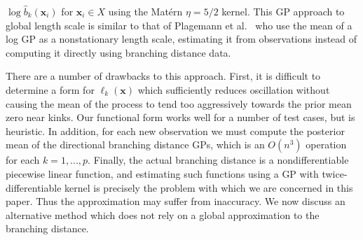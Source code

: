\documentclass{article}
\renewcommand{\vec}[1]{\mathbf{#1}}
\numberwithin{equation}{section}
\begin{document}
$\log \hat{b}_k(\vec{x}_i)$ for $\vec{x}_i \in X$ using the Mat\'ern $\eta = 5/2$ kernel. This GP approach to global length scale is similar to that of Plagemann et al.~\cite{plagemann2008nonstationary} who use the mean of a log GP as a nonstationary length scale, estimating it from observations instead of computing it directly using branching distance data.

There are a number of drawbacks to this approach. First, it is difficult to determine a form for $\ell_k(\vec{x})$ which sufficiently reduces oscillation without causing the mean of the process to tend too aggressively towards the prior mean zero near kinks. Our functional form works well for a number of test cases, but is heuristic. In addition, for each new observation we must compute the posterior mean of the directional branching distance GPs, which is an $O(n^3)$ operation for each $k=1,...,p$. Finally, the actual branching distance is a nondifferentiable piecewise linear function, and estimating such functions using a GP with twice-differentiable kernel is precisely the problem with which we are concerned in this paper. Thus the approximation may suffer from inaccuracy. We now discuss an alternative method which does not rely on a global approximation to the branching distance.
\end{document}
